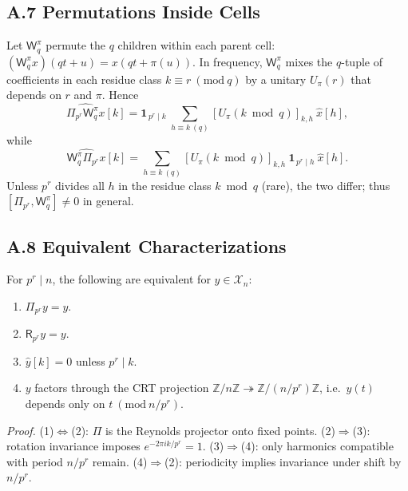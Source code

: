 \documentclass[12pt]{article}
\numberwithin{equation}{section}
\theoremstyle{plain}
\theoremstyle{definition}
\theoremstyle{remark}
\begin{document}
\subsection*{A.7 Permutations Inside Cells}
Let $\mathsf{W}_q^{\pi}$ permute the $q$ children within each parent cell: $(\mathsf{W}_q^{\pi}x)(qt+u)=x(qt+\pi(u))$.
In frequency, $\mathsf{W}_q^{\pi}$ mixes the $q$-tuple of coefficients in each residue class $k\equiv r\ (\mathrm{mod}\ q)$ by a unitary $U_\pi(r)$ that depends on $r$ and $\pi$. Hence
\[
\widehat{\Pi_{p^r}\mathsf{W}_q^{\pi}x}[k]=\mathbf{1}_{\,p^r\mid k}\ \sum_{h\equiv k\ (q)} [U_\pi(k\bmod q)]_{k,h}\ \widehat{x}[h],
\]
while
\[
\widehat{\mathsf{W}_q^{\pi}\Pi_{p^r}x}[k]=\sum_{h\equiv k\ (q)} [U_\pi(k\bmod q)]_{k,h}\ \mathbf{1}_{\,p^r\mid h}\ \widehat{x}[h].
\]
Unless $p^r$ divides all $h$ in the residue class $k\bmod q$ (rare), the two differ; thus $[\Pi_{p^r},\mathsf{W}_q^{\pi}]\neq 0$ in general.

\subsection*{A.8 Equivalent Characterizations}
For $p^r\mid n$, the following are equivalent for $y\in\mathcal{X}_n$:
\begin{enumerate}
\item $\Pi_{p^r}y=y$.
\item $\mathsf{R}_{p^r}y=y$.
\item $\widehat{y}[k]=0$ unless $p^r\mid k$.
\item $y$ factors through the CRT projection $\mathbb{Z}/n\mathbb{Z}\twoheadrightarrow \mathbb{Z}/(n/p^r)\mathbb{Z}$, i.e.\ $y(t)$ depends only on $t\ (\mathrm{mod}\ n/p^r)$.
\end{enumerate}
\emph{Proof.} (1)$\Leftrightarrow$(2): $\Pi$ is the Reynolds projector onto fixed points. (2)$\Rightarrow$(3): rotation invariance imposes $e^{-2\pi i k/p^r}=1$. (3)$\Rightarrow$(4): only harmonics compatible with period $n/p^r$ remain. (4)$\Rightarrow$(2): periodicity implies invariance under shift by $n/p^r$.
\end{document}
